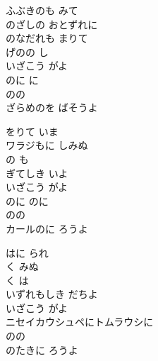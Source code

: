 \documentclass[10pt,b5j]{tarticle} %
\begin{document}
\vspace{1.5em} %
\newcommand{\linespace}{0.5em} %
\newcommand{\blocksize}{0.5\hsize} %
\begin{enumerate} %
    \begin{minipage}[c]{\blocksize}
    
        \vspace{\linespace}
        \item
        ふぶきのも みて\\
        のざしの おとずれに\\
        のなだれも まりて\\
        げのの し\\
        いざこう がよ\\
        のに に\\
        のの\\
        ざらめのを ばそうよ
        
        \vspace{\linespace}
        \item
        をりて いま\\
        ワラジもに しみぬ\\
        の も\\
        ぎてしき いよ\\
        いざこう がよ\\
        のに のに\\
        のの\\
        カールのに ろうよ
        
        \vspace{\linespace}
        \item
        はに られ\\
        く みぬ\\
        く は\\
        いずれもしき だちよ\\
        いざこう がよ\\
        ニセイカウシュペにトムラウシに\\
        のの\\
        のたきに ろうよ
        

\end{minipage}
\end{enumerate}
\end{document}

